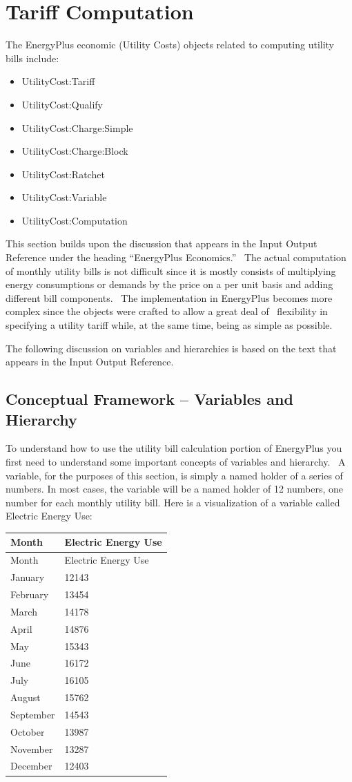 \section{Tariff Computation}\label{tariff-computation}

The EnergyPlus economic (Utility Costs) objects related to computing utility bills include:

\begin{itemize}
\item
  UtilityCost:Tariff
\item
  UtilityCost:Qualify
\item
  UtilityCost:Charge:Simple
\item
  UtilityCost:Charge:Block
\item
  UtilityCost:Ratchet
\item
  UtilityCost:Variable
\item
  UtilityCost:Computation
\end{itemize}

This section builds upon the discussion that appears in the Input Output Reference under the heading ``EnergyPlus Economics.''~ The actual computation of monthly utility bills is not difficult since it is mostly consists of multiplying energy consumptions or demands by the price on a per unit basis and adding different bill components.~ The implementation in EnergyPlus becomes more complex since the objects were crafted to allow a great deal of~ flexibility in specifying a utility tariff while, at the same time, being as simple as possible.

The following discussion on variables and hierarchies is based on the text that appears in the Input Output Reference.

\subsection{Conceptual Framework -- Variables and Hierarchy}\label{conceptual-framework-variables-and-hierarchy}

To understand how to use the utility bill calculation portion of EnergyPlus you first need to understand some important concepts of variables and hierarchy.~ A variable, for the purposes of this section, is simply a named holder of a series of numbers. In most cases, the variable will be a named holder of 12 numbers, one number for each monthly utility bill. Here is a visualization of a variable called Electric Energy Use:

\begin{longtable}[c]{@{}ll@{}}
\toprule 
Month & Electric Energy Use \tabularnewline
\midrule
\endfirsthead

\toprule 
Month & Electric Energy Use \tabularnewline
\midrule
\endhead

January & 12143 \tabularnewline
February & 13454 \tabularnewline
March & 14178 \tabularnewline
April & 14876 \tabularnewline
May & 15343 \tabularnewline
June & 16172 \tabularnewline
July & 16105 \tabularnewline
August & 15762 \tabularnewline
September & 14543 \tabularnewline
October & 13987 \tabularnewline
November & 13287 \tabularnewline
December & 12403 \tabularnewline
\bottomrule
\end{longtable}

